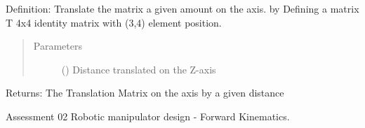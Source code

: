 \documentclass[letterpaper,10pt,english,openany,oneside]{sphinxmanual}
\begin{document}
\begin{fulllineitems}
\begin{fulllineitems}
\label{\detokenize{Forward_Kinematics:Forward_Kinematics.ForwardKinematics.trans_z}}
Definition: Translate the matrix a given amount  on the  axis. by Defining a matrix T 4x4 identity
matrix with  (3,4) element position.
\begin{quote}\begin{description}
\item[{Parameters}] \leavevmode
{} () \textendash{} Distance translated on the Z-axis

\end{description}\end{quote}

Returns: The Translation Matrix on the  axis by a given distance

\end{fulllineitems}


\end{fulllineitems}


\begin{fulllineitems}
\label{\detokenize{Forward_Kinematics:Forward_Kinematics.main}}
Assessment 02 Robotic manipulator design - Forward Kinematics.

\end{fulllineitems}


\begin{fulllineitems}
\label{\detokenize{Forward_Kinematics:Forward_Kinematics.printM}}
\end{fulllineitems}
\end{document}

